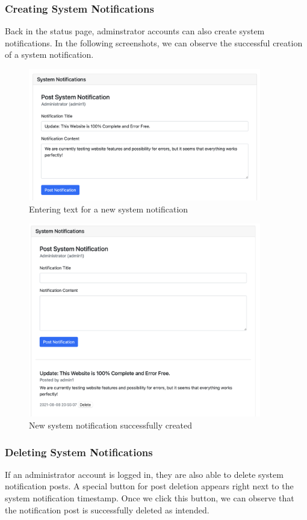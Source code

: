 \documentclass[12pt, letterpaper]{article}
\begin{document}
\newpage
\subsubsection*{Creating System Notifications}
Back in the status page, adminstrator accounts can also create system notifications. In the following screenshots, we can observe the successful creation of a system notification.

\begin{figure}[htbp]
\centering
\includegraphics[width=4in]{images/30-journey-a05a.png}
\caption{Entering text for a new system notification}
\end{figure}

\begin{figure}[htbp]
\centering
\includegraphics[width=4in]{images/30-journey-a05b.png}
\caption{New system notification successfully created}
\end{figure}

\newpage
\subsubsection*{Deleting System Notifications}
If an administrator account is logged in, they are also able to delete system notification posts. A special button for post deletion appears right next to the system notification timestamp. Once we click this button, we can observe that the notification post is successfully deleted as intended.
\end{document}
